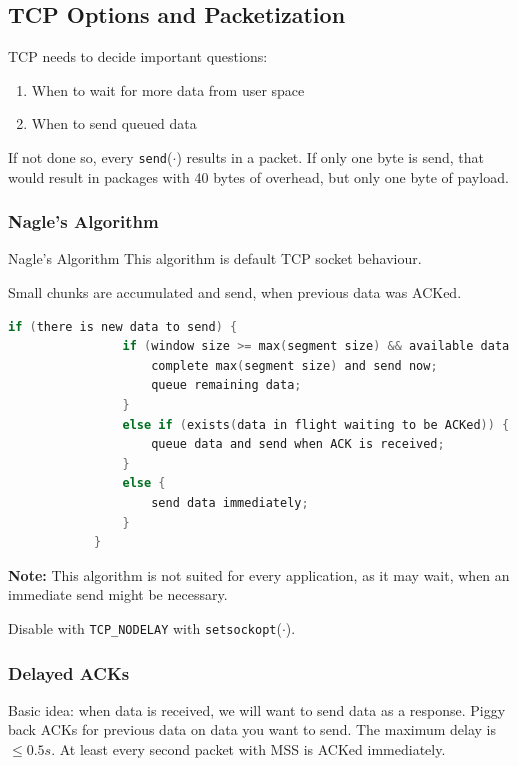\documentclass[english]{panikzettel}
\newcommand{\fkt}[1]{\texttt{#1}(\(\cdot\))}
\begin{document}
	\subsection{TCP Options and Packetization}
	\label{tcp-options-and-packetization}
	
	TCP needs to decide important questions: 
	\begin{enumerate}
		\item When to wait for more data from user space
		\item When to send queued data
	\end{enumerate}
	
	If not done so, every \fkt{send} results in a packet. If only one byte is send, that would result in packages with 40 bytes of overhead, but only one byte of payload.

	\subsubsection{Nagle's Algorithm}
	\label{nagles-algorithm}
	
	\begin{algo}{Nagle's Algorithm}
		This algorithm is default TCP socket behaviour.

		Small chunks are accumulated and send, when previous data was ACKed.
		\begin{lstlisting}[language=C]
			if (there is new data to send) {
				if (window size >= max(segment size) && available data >= max(segment size)) {
					complete max(segment size) and send now;
					queue remaining data;
				}
				else if (exists(data in flight waiting to be ACKed)) {
					queue data and send when ACK is received;
				}
				else {
					send data immediately;
				}
			}
		\end{lstlisting}
		\tcblower
		\textbf{Note:} This algorithm is not suited for every application, as it may wait, when an immediate send might be necessary.
	\end{algo}
	
	Disable with \texttt{TCP\_NODELAY} with \fkt{setsockopt}.

	\subsubsection{Delayed ACKs}
	\label{delayed-acks}

	Basic idea: when data is received, we will want to send data as a response.
	Piggy back ACKs for previous data on data you want to send.
	The maximum delay is \( \leq 0.5 \textit{s} \).
	At least every second packet with MSS is ACKed immediately.
	
\end{document}
